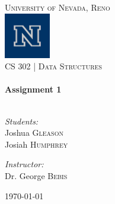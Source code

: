 \begin{titlepage}
	\begin{center}

		\textsc{\LARGE University of Nevada, Reno}\\[.5cm]
		\includegraphics[width=0.15\textwidth]{./logo.png}\\[.5cm]

		\textsc{\large CS 302 | Data Structures } \\[.5cm]

		\HRule \\[0.4cm]
		{ \huge \bfseries Assignment 1}\\[0.4cm]

		\HRule \\[1.5cm]

		\begin{minipage}{0.4\textwidth}
			\begin{flushleft} \large
				\emph{Students:}\\
				Joshua \textsc{Gleason}\\
				Josiah \textsc{Humphrey}
			\end{flushleft}
		\end{minipage}
		\begin{minipage}{0.4\textwidth}
			\begin{flushright} \large
				\emph{Instructor:} \\
				Dr. George \textsc{Bebis}
			\end{flushright}
		\end{minipage}

		\vfill

		{\large \today}

	\end{center}

\end{titlepage}
